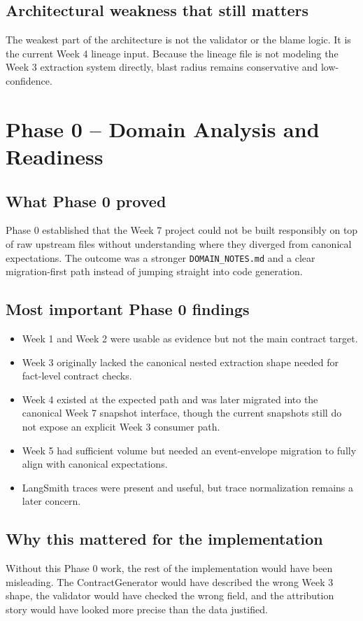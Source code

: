 \documentclass[11pt]{report}
\begin{document}
\section{Architectural weakness that still matters}
The weakest part of the architecture is not the validator or the blame logic. It is the current Week 4 lineage input. Because the lineage file is not modeling the Week 3 extraction system directly, blast radius remains conservative and low-confidence.

\clearpage
\chapter{Phase 0 -- Domain Analysis and Readiness}

\section{What Phase 0 proved}
Phase 0 established that the Week 7 project could not be built responsibly on top of raw upstream files without understanding where they diverged from canonical expectations. The outcome was a stronger \texttt{DOMAIN\_NOTES.md} and a clear migration-first path instead of jumping straight into code generation.

\section{Most important Phase 0 findings}
\begin{itemize}[leftmargin=1.5em]
  \item Week 1 and Week 2 were usable as evidence but not the main contract target.
  \item Week 3 originally lacked the canonical nested extraction shape needed for fact-level contract checks.
  \item Week 4 existed at the expected path and was later migrated into the canonical Week 7 snapshot interface, though the current snapshots still do not expose an explicit Week 3 consumer path.
  \item Week 5 had sufficient volume but needed an event-envelope migration to fully align with canonical expectations.
  \item LangSmith traces were present and useful, but trace normalization remains a later concern.
\end{itemize}

\section{Why this mattered for the implementation}
Without this Phase 0 work, the rest of the implementation would have been misleading. The ContractGenerator would have described the wrong Week 3 shape, the validator would have checked the wrong field, and the attribution story would have looked more precise than the data justified.
\end{document}
